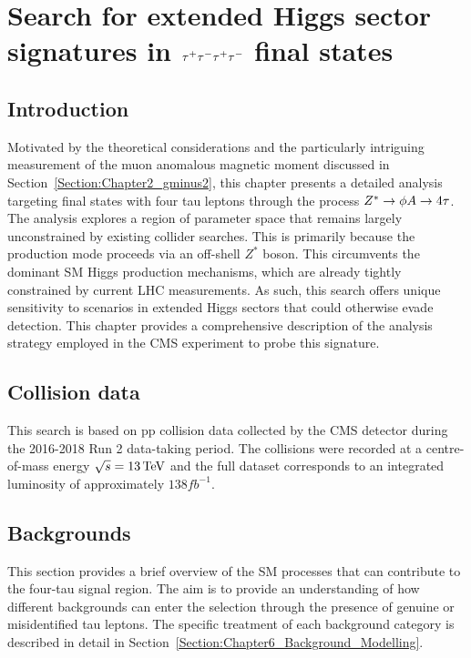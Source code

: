 \chapter{\texorpdfstring{Search for extended Higgs sector signatures in $\tau^+\tau^-\tau^+\tau^-$ final states}{Search for extended Higgs sector signatures in tautautautau final states}}
\thispagestyle{plain}  %
\pagestyle{chapterpages}
\label{Section:Chapter_4tau}
\minitoc

\section{Introduction}

Motivated by the theoretical considerations and the particularly intriguing measurement of the muon anomalous magnetic moment discussed in Section~\ref{Section:Chapter2_gminus2}, this chapter presents a detailed analysis targeting final states with four tau leptons through the process $Z^*\rightarrow\phi A\rightarrow4\tau$. The analysis explores a region of parameter space that remains largely unconstrained by existing collider searches. This is primarily because the production mode proceeds via an off-shell $Z^*$ boson. This circumvents the dominant SM Higgs production mechanisms, which are already tightly constrained by current LHC measurements. As such, this search offers unique sensitivity to scenarios in extended Higgs sectors that could otherwise evade detection. This chapter provides a comprehensive description of the analysis strategy employed in the CMS experiment to probe this signature. 

\section{Collision data}

This search is based on pp collision data collected by the CMS detector during the 2016-2018 Run 2 data-taking period. The collisions were recorded at a centre-of-mass energy $\sqrt{s} = 13\,\text{Te\hspace{-.08em}V}$ and the full dataset corresponds to an integrated luminosity of approximately $138\unit{fb}^{-1}$.

\section{Backgrounds}
\label{Section:Chapter6_Backgrounds}
This section provides a brief overview of the SM processes that can contribute to the four-tau signal region. The aim is to provide an understanding of how different backgrounds can enter the selection through the presence of genuine or misidentified tau leptons. The specific treatment of each background category is described in detail in Section~\ref{Section:Chapter6_Background_Modelling}.

